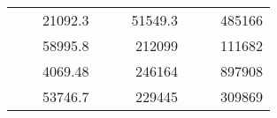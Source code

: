 \begin{table}[H]
\begin{tabular}{|ccrccrccc}
\rowcolor[HTML]{DDFDFF} 
\multicolumn{1}{|c|}{\cellcolor[HTML]{FFFFC7}}                                & \multicolumn{1}{c|}{\cellcolor[HTML]{DDFDFF}}                      & \multicolumn{1}{r|}{\cellcolor[HTML]{DAE8FC}21092.3}   & \multicolumn{1}{c|}{\cellcolor[HTML]{FFFFC7}}                                & \multicolumn{1}{c|}{\cellcolor[HTML]{DDFDFF}}                       & \multicolumn{1}{r|}{\cellcolor[HTML]{DDFDFF}51549.3}   & \multicolumn{1}{c|}{\cellcolor[HTML]{FFFFC7}}                                & \multicolumn{1}{c|}{\cellcolor[HTML]{DDFDFF}}                      & \multicolumn{1}{r|}{\cellcolor[HTML]{DDFDFF}485166}    \\ \cline{3-3} \cline{6-6} \cline{9-9} 
\multicolumn{1}{|c|}{\cellcolor[HTML]{FFFFC7}}                                & \multicolumn{1}{c|}{\cellcolor[HTML]{DDFDFF}}                      & \multicolumn{1}{r|}{\cellcolor[HTML]{DDFDFF}58995.8}   & \multicolumn{1}{c|}{\cellcolor[HTML]{FFFFC7}}                                & \multicolumn{1}{c|}{\cellcolor[HTML]{DDFDFF}}                       & \multicolumn{1}{r|}{\cellcolor[HTML]{DAE8FC}212099}    & \multicolumn{1}{c|}{\cellcolor[HTML]{FFFFC7}}                                & \multicolumn{1}{c|}{\cellcolor[HTML]{DDFDFF}}                      & \multicolumn{1}{r|}{\cellcolor[HTML]{DAE8FC}111682}    \\ \cline{3-3} \cline{6-6} \cline{9-9} 
\rowcolor[HTML]{DDFDFF} 
\multicolumn{1}{|c|}{\cellcolor[HTML]{FFFFC7}}                                & \multicolumn{1}{c|}{\cellcolor[HTML]{DDFDFF}}                      & \multicolumn{1}{r|}{\cellcolor[HTML]{DAE8FC}4069.48}   & \multicolumn{1}{c|}{\cellcolor[HTML]{FFFFC7}}                                & \multicolumn{1}{c|}{\cellcolor[HTML]{DDFDFF}}                       & \multicolumn{1}{r|}{\cellcolor[HTML]{DDFDFF}246164}    & \multicolumn{1}{c|}{\cellcolor[HTML]{FFFFC7}}                                & \multicolumn{1}{c|}{\cellcolor[HTML]{DDFDFF}}                      & \multicolumn{1}{r|}{\cellcolor[HTML]{DDFDFF}897908}    \\ \cline{3-3} \cline{6-6} \cline{9-9} 
\multicolumn{1}{|c|}{\cellcolor[HTML]{FFFFC7}}                                & \multicolumn{1}{c|}{\cellcolor[HTML]{DDFDFF}}                      & \multicolumn{1}{r|}{\cellcolor[HTML]{DDFDFF}53746.7}   & \multicolumn{1}{c|}{\cellcolor[HTML]{FFFFC7}}                                & \multicolumn{1}{c|}{\cellcolor[HTML]{DDFDFF}}                       & \multicolumn{1}{r|}{\cellcolor[HTML]{DAE8FC}229445}    & \multicolumn{1}{c|}{\cellcolor[HTML]{FFFFC7}}                                & \multicolumn{1}{c|}{\cellcolor[HTML]{DDFDFF}}                      & \multicolumn{1}{r|}{\cellcolor[HTML]{DAE8FC}309869}    \\ \cline{3-3} \cline{6-6} \cline{9-9} 

\end{tabular}
\end{table}
